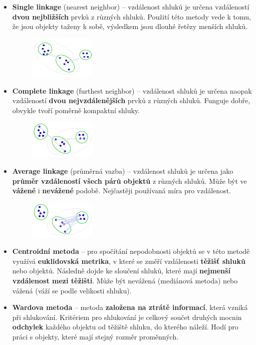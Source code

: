 \begin{itemize}
\item \textbf{Single linkage} (nearest neighbor) -- vzdálenost shluků je určena vzdáleností \textbf{dvou nejbližších} prvků z různých shluků. Použití této metody vede k tomu, že jsou objekty taženy k sobě, výsledkem jsou dlouhé řetězy menších shluků.
\begin{figure}[H]
	\centering
	\includegraphics[width=0.3\textwidth]{assets/10_single_linkage}
\end{figure}
\item \textbf{Complete linkage} (furthest neighbor) -- vzdálenost shluků je určena naopak vzdáleností \textbf{dvou nejvzdálenějších} prvků z různých shluků. Funguje dobře, obvykle tvoří poměrně kompaktní shluky.
\begin{figure}[H]
	\centering
	\includegraphics[width=0.3\textwidth]{assets/10_complete_linkage}
\end{figure}
\item \textbf{Average linkage} (průměrná vazba) -- vzdálenost shluků je určena jako \textbf{průměr vzdáleností všech párů objektů} z různých shluků. Může být ve \textbf{vážené} i \textbf{nevážené} podobě. Nejčastěji používaná míra pro vzdálenost.
\begin{figure}[H]
	\centering
	\includegraphics[width=0.3\textwidth]{assets/10_avg_linkage}
\end{figure}
\item \textbf{Centroidní metoda} -- pro spočítání nepodobnosti objektů se v této metodě využívá \textbf{euklidovská metrika}, v které se změří vzdálenosti \textbf{těžišť shluků} nebo objektů. Následně dojde ke sloučení shluků, které mají \textbf{nejmenší vzdálenost mezi těžišti}. Může být nevážená (mediánová metoda) nebo vážená (váží se podle velikosti shluku).
\item \textbf{Wardova metoda} -- metoda \textbf{založena na ztrátě informací}, která vzniká při shlukování. Kritériem pro shlukování je celkový součet druhých mocnin \textbf{odchylek} každého objektu od těžiště shluku, do kterého náleží.  Hodí pro práci s objekty, které mají stejný rozměr proměnných.
\end{itemize}

